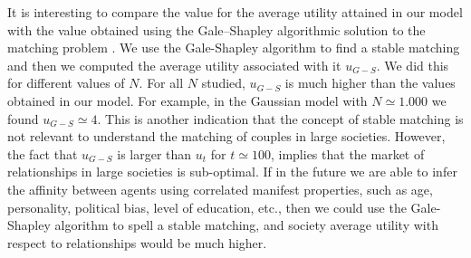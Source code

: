 \documentclass[12pt]{article}
\begin{document}
It is interesting to compare the value for the average utility attained in our model with the value obtained using the Gale–Shapley algorithmic solution to the matching problem \cite{10.2307/2312726}. We use the Gale-Shapley algorithm to find a stable matching and then we computed the average utility associated with it $u_{G-S}$. We did this for different values of $N$. For all $N$ studied, $u_{G-S}$ is much higher than the values obtained in our model. For example, in the Gaussian model with $N\simeq 1.000$ we found $u_{G-S}\simeq 4$. This is another indication that the concept of stable matching is not relevant to understand the matching of couples in large societies. However, the fact that $u_{G-S}$ is larger than $u_t$ for $t\simeq100$, implies that the market of relationships in large societies is sub-optimal. If in the future we are able to infer the affinity between agents using correlated manifest properties, such as age, personality, political bias, level of education, etc., then we could use the Gale-Shapley algorithm to spell a stable matching, and society average utility with respect to relationships would be much higher.

\end{document}
